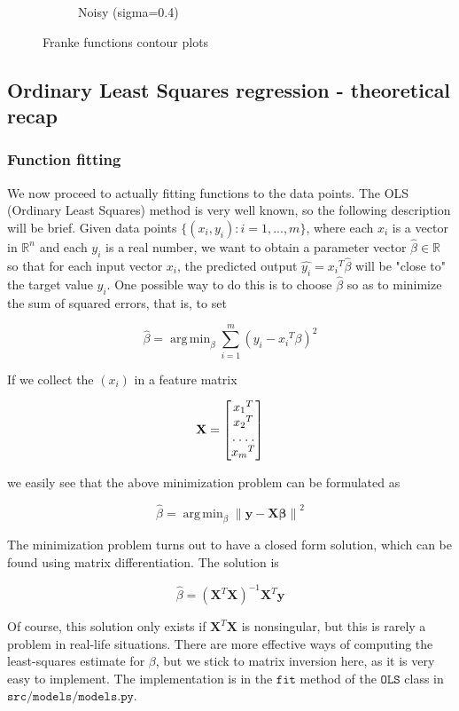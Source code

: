 \documentclass{article}
\DeclareMathOperator*{\argminA}{arg\,min}
\begin{document}
\begin{figure}[h!]
\begin{subfigure}{0.6\linewidth}
        \caption{Noisy (sigma=0.4)}
    \end{subfigure}
    \caption{Franke functions contour plots}
\end{figure}


\subsection{Ordinary Least Squares regression - theoretical recap}
\subsubsection{Function fitting}

We now proceed to actually fitting functions to the data points. The OLS (Ordinary Least Squares) method is very well known, so the following description will be brief. Given data points $\{(x_i, y_i): i=1, ..., m\}$, where each $x_i$ is a vector in $\mathbb{R}^n$ and each $y_i$ is a real number, we want to obtain a parameter vector $\hat{\beta}\in\mathbb{R}$ so that for each input vector $x_i$, the predicted output $\hat{y_i}={x_i}^T \hat{\beta}$ will be "close to" the target value $y_i$. One possible way to do this is to choose $\hat{\beta}$ so as to minimize the sum of squared errors, that is, to set

$$
\hat{\beta} = \argminA_{\beta} \sum_{i=1}^{m}{(y_i - {x_i}^T \beta)^2}
$$

If we collect the $(x_i)$ in a feature matrix

$$
\mathbf{X} =
\begin{bmatrix}
    {x_1}^T \\
    {x_2}^T \\
    \hdotsfor{1} \\
    {x_m}^T
\end{bmatrix}
$$

we easily see that the above minimization problem can be formulated as

$$
\hat{\beta} = \argminA_{\beta} \left\|\mathbf{y - X\beta}\right\|^2
$$

The minimization problem turns out to have a closed form solution, which can be found using matrix differentiation. The solution is

$$
\hat{\beta} = ({\mathbf{X}}^T \mathbf{X})^{-1} {\mathbf{X}}^T \mathbf{y}
$$

Of course, this solution only exists if ${\mathbf{X}}^T \mathbf{X}$ is nonsingular, but this is rarely a problem in real-life situations. There are more effective ways of computing the least-squares estimate for $\beta$, but we stick to matrix inversion here, as it is very easy to implement. The implementation is in the $\texttt{fit}$ method of the $\texttt{OLS}$ class in $\texttt{src/models/models.py}$.
\end{document}
